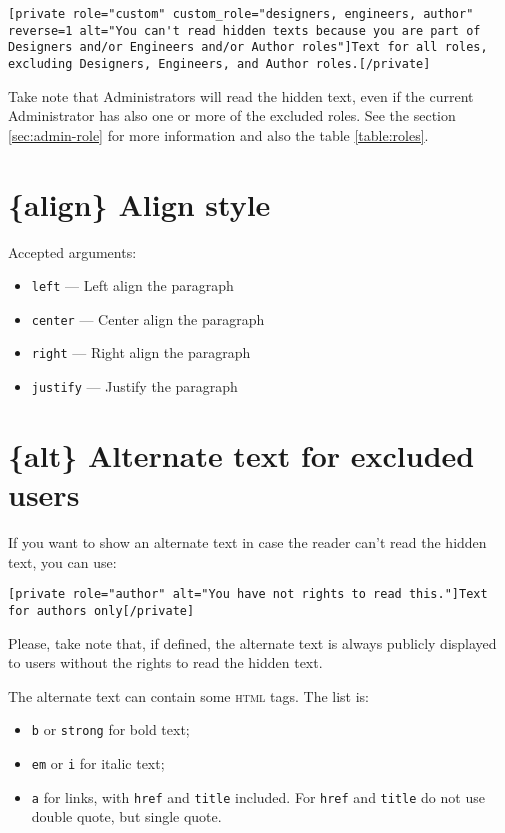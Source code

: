 \begin{lstlisting}
[private role="custom" custom_role="designers, engineers, author" reverse=1 alt="You can't read hidden texts because you are part of Designers and/or Engineers and/or Author roles"]Text for all roles, excluding Designers, Engineers, and Author roles.[/private]
\end{lstlisting}

Take note that Administrators will read the hidden text, even if the current
Administrator has also one or more of the excluded roles. See the section
\vref{sec:admin-role} for more information and also the table \vref{table:roles}.

\section{\{align\} Align style}

Accepted arguments:

\begin{itemize}
 \item \verb+left+ --- Left align the paragraph
 \item \verb+center+ --- Center align the paragraph
 \item \verb+right+ --- Right align the paragraph
 \item \verb+justify+ --- Justify the paragraph
\end{itemize}

\section{\{alt\} Alternate text for excluded users}

If you want to show an alternate text in case the reader can't read the hidden
text, you can use:

\begin{lstlisting}
[private role="author" alt="You have not rights to read this."]Text for authors only[/private]
\end{lstlisting}

Please, take note that, if defined, the alternate text is always publicly
displayed to users without the rights to read the hidden text.

The alternate text can contain some \textsc{html} tags. The list is:

\begin{itemize}
 \item \verb+b+ or \verb+strong+ for bold text;
 \item \verb+em+ or \verb+i+ for italic text;
 \item \verb+a+ for links, with \verb+href+ and \verb+title+ included. For
 \verb+href+ and \verb+title+ do not use double quote, but single quote.
\end{itemize}

